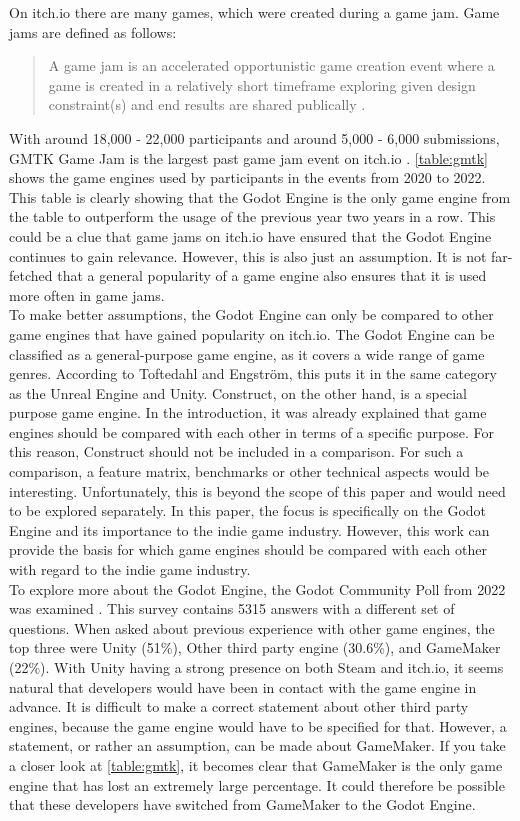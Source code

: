 On itch.io there are many games, which were created during a game jam.
Game jams are defined as follows:
\blockquote{A game jam is an accelerated opportunistic game creation event where a game is created in a relatively short timeframe exploring given design constraint(s) and end results are shared publically \cite{game-jam-definition}.}
With around 18,000 - 22,000 participants and around 5,000 - 6,000 submissions, GMTK Game Jam is the largest past game jam event on itch.io \cite{itch-past-jams}.
\autoref{table:gmtk} shows the game engines used by participants in the events from 2020 to 2022.
This table is clearly showing that the Godot Engine is the only game engine from the table to outperform the usage of the previous year two years in a row.
This could be a clue that game jams on itch.io have ensured that the Godot Engine continues to gain relevance.
However, this is also just an assumption.
It is not far-fetched that a general popularity of a game engine also ensures that it is used more often in game jams.\\

To make better assumptions, the Godot Engine can only be compared to other game engines that have gained popularity on itch.io.
The Godot Engine can be classified as a general-purpose game engine, as it covers a wide range of game genres.
According to Toftedahl and Engström, this puts it in the same category as the Unreal Engine and Unity.
Construct, on the other hand, is a special purpose game engine.
In the introduction, it was already explained that game engines should be compared with each other in terms of a specific purpose.
For this reason, Construct should not be included in a comparison.
For such a comparison, a feature matrix, benchmarks or other technical aspects would be interesting.
Unfortunately, this is beyond the scope of this paper and would need to be explored separately.
In this paper, the focus is specifically on the Godot Engine and its importance to the indie game industry.
However, this work can provide the basis for which game engines should be compared with each other with regard to the indie game industry.\\

To explore more about the Godot Engine, the Godot Community Poll from 2022 was examined \cite{godot-poll-results}.
This survey contains 5315 answers with a different set of questions.
When asked about previous experience with other game engines, the top three were Unity (51\%), Other third party engine (30.6\%), and GameMaker (22\%).
With Unity having a strong presence on both Steam and itch.io, it seems natural that developers would have been in contact with the game engine in advance.
It is difficult to make a correct statement about other third party engines, because the game engine would have to be specified for that.
However, a statement, or rather an assumption, can be made about GameMaker.
If you take a closer look at \autoref{table:gmtk}, it becomes clear that GameMaker is the only game engine that has lost an extremely large percentage.
It could therefore be possible that these developers have switched from GameMaker to the Godot Engine.\\

